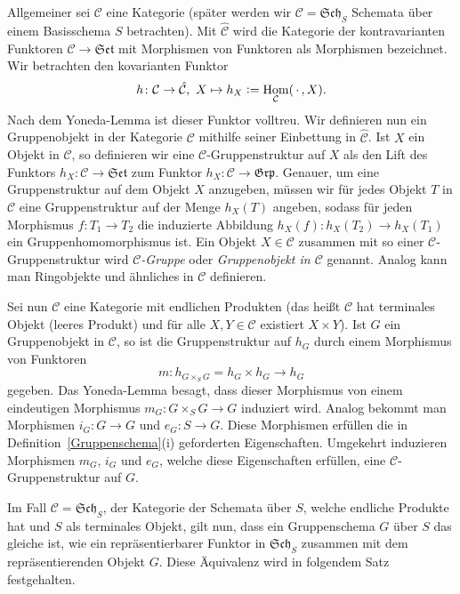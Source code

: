 \documentclass[DIV11,11pt]{scrartcl}
\theoremstyle{Definitionen}
\theoremstyle{Aussagen}
\newcommand{\coloneq}{\ensuremath{\mathrel{\mathop{\raisebox{0.5pt}{:}}}=}}
\DeclareMathOperator{\Hom}{Hom}
\begin{document}
Allgemeiner sei $\mathcal{C}$ eine Kategorie (später werden wir $\mathcal{C}=\mathfrak{Sch}_S$ Schemata über einem Basisschema $S$ betrachten). Mit $\hat{\mathcal{C}}$ wird die Kategorie der kontravarianten Funktoren $\mathcal{C}\rightarrow\mathfrak{Set}$ mit Morphismen von Funktoren als Morphismen bezeichnet. Wir betrachten den kovarianten Funktor
\begin{displaymath}
h\colon\mathcal{C}\rightarrow\hat{\mathcal{C}},~X\mapsto h_X\coloneq\Hom_{\mathcal{C}}(\,\cdot\, ,X).
\end{displaymath}
Nach dem Yoneda-Lemma ist dieser Funktor volltreu. Wir definieren nun ein Gruppenobjekt in der Kategorie $\mathcal{C}$ mithilfe seiner Einbettung in $\hat{\mathcal{C}}$. Ist $X$ ein Objekt in $\mathcal{C}$, so definieren wir eine $\mathcal{C}$-Gruppenstruktur auf $X$ als den Lift des Funktors $h_X\colon\mathcal{C}\rightarrow\mathfrak{Set}$ zum Funktor $h_X\colon\mathcal{C}\rightarrow\mathfrak{Grp}$. Genauer, um eine Gruppenstruktur auf dem Objekt $X$ anzugeben, müssen wir für jedes Objekt $T$ in $\mathcal{C}$ eine Gruppenstruktur auf der Menge $h_X(T)$ angeben, sodass für jeden Morphismus $f\colon T_1\rightarrow T_2$ die induzierte Abbildung $h_X(f)\colon h_X(T_2)\rightarrow h_X(T_1)$ ein Gruppenhomomorphismus ist. Ein Objekt $X\in\mathcal{C}$ zusammen mit so einer $\mathcal{C}$-Gruppenstruktur wird \textit{$\mathcal{C}$-Gruppe} oder \textit{Gruppenobjekt in $\mathcal{C}$} genannt. Analog kann man Ringobjekte und ähnliches in $\mathcal{C}$ definieren.

Sei nun $\mathcal{C}$ eine Kategorie mit endlichen Produkten (das heißt $\mathcal{C}$ hat terminales Objekt (leeres Produkt) und für alle $X,Y\in\mathcal{C}$ existiert $X\times Y$). Ist $G$ ein Gruppenobjekt in $\mathcal{C}$, so ist die Gruppenstruktur auf $h_G$ durch einem Morphismus von Funktoren
\begin{displaymath}
m\colon h_{G\times_S G}=h_G\times h_G\rightarrow h_G
\end{displaymath}
gegeben. Das Yoneda-Lemma besagt, dass dieser Morphismus von einem eindeutigen Morphismus $m_G\colon G\times_S G\rightarrow G$ induziert wird. Analog bekommt man Morphismen $i_G\colon G\rightarrow G$ und $e_G\colon S\rightarrow G$. Diese Morphismen erfüllen die in Definition~\ref{Gruppenschema}(i) geforderten Eigenschaften. Umgekehrt induzieren Morphismen $m_G$, $i_G$ und $e_G$, welche diese Eigenschaften erfüllen, eine $\mathcal{C}$-Gruppenstruktur auf $G$.

Im Fall $\mathcal{C}=\mathfrak{Sch}_S$, der Kategorie der Schemata über $S$, welche endliche Produkte hat und $S$ als terminales Objekt, gilt nun, dass ein Gruppenschema $G$ über $S$ das gleiche ist, wie ein repräsentierbarer Funktor in $\mathfrak{Sch}_S$ zusammen mit dem repräsentierenden Objekt $G$. Diese Äquivalenz wird in folgendem Satz festgehalten.
\end{document}
